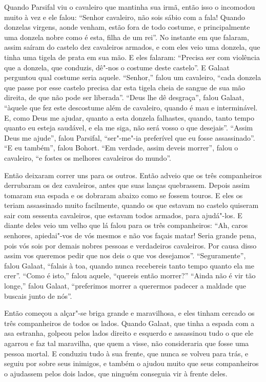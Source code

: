 Quando Parsifal viu o cavaleiro que mantinha sua irmã, então isso o incomodou
muito à vez e ele falou: “Senhor cavaleiro, não sois sábio com a fala! Quando
donzelas virgens, aonde venham, estão fora de todo costume, e principalmente
uma donzela nobre como é esta, filha de um rei”. No instante em que falaram,
assim saíram do castelo dez cavaleiros armados, e com eles veio uma donzela,
que tinha uma tigela de prata em sua mão. E eles falaram: “Precisa ser com
violência que a donzela, que conduzis, dê"-nos o costume deste castelo”. E
Galaat perguntou qual costume seria aquele. “Senhor,” falou um cavaleiro, “cada
donzela que passe por esse castelo precisa dar esta tigela cheia de sangue de
sua mão direita, de que não pode ser liberada”. “Deus lhe dê desgraça”, falou
Galaat, “àquele que fez este descostume além de cavaleiro, quando é mau e
interminável. E, como Deus me ajudar, quanto a esta donzela falhastes, quando,
tanto tempo quanto eu esteja saudável, e ela me siga, não será vosso o que
desejais”. “Assim Deus me ajude”, falou Parsifal, “ser"-me"-ia preferível que eu
fosse assassinado”. “E eu também”, falou Bohort. “Em verdade, assim deveis
morrer”, falou o cavaleiro, “e fostes os melhores cavaleiros do mundo”.

 Então deixaram correr uns para os outros. Então adveio que os três companheiros
derrubaram os dez cavaleiros, antes que suas lanças quebrassem. Depois assim
tomaram sua espada e os dobraram abaixo como se fossem touros. E eles os teriam
assassinado muito facilmente, quando os que estavam no castelo quiseram sair
com sessenta cavaleiros, que estavam todos armados, para ajudá"-los. E diante
deles veio um velho que lá falou para os três companheiros: “Ah, caros
senhores, apiedai"-vos de vós mesmos e não vos façais matar! Seria grande pena,
pois vós sois por demais nobres pessoas e verdadeiros cavaleiros. Por causa
disso assim vos queremos pedir que nos deis o que vos desejamos”.
“Seguramente”, falou Galaat, “falais à toa, quando nunca recebereis tanto tempo
quanto ela me crer”. “Como é isto,” falou aquele, “quereis então morrer?”
“Ainda não é vir tão longe,” falou Galaat, “preferimos morrer a querermos
padecer a maldade que buscais junto de nós”. 

Então começou a alçar"-se briga grande e maravilhosa, e eles tinham cercado os
três companheiros de todos os lados. Quando Galaat, que tinha a espada com a
asa estranha, golpeou pelos lados direito e esquerdo e assassinou tudo o que
ele agarrou e faz tal maravilha, que quem a visse, não consideraria que fosse
uma pessoa mortal. E conduziu tudo à sua frente, que nunca se volveu para trás,
e seguiu por sobre seus inimigos, e também o ajudou muito que seus companheiros
o ajudassem pelos dois lados, que ninguém conseguia vir à frente deles. 

